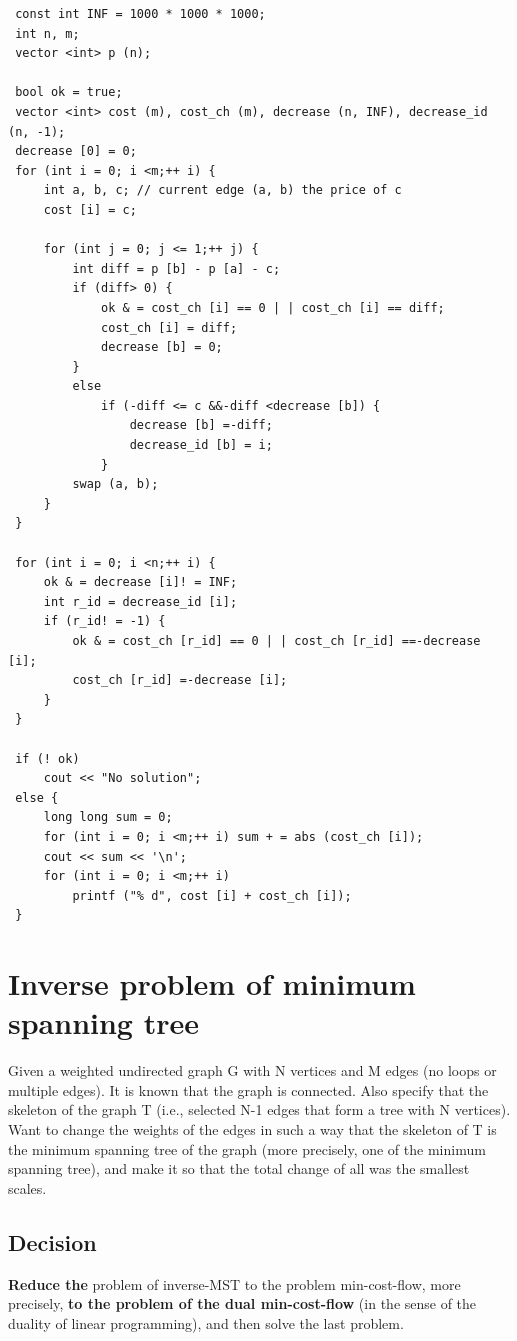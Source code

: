 \begin{verbatim}
 const int INF = 1000 * 1000 * 1000;
 int n, m;
 vector <int> p (n);

 bool ok = true;
 vector <int> cost (m), cost_ch (m), decrease (n, INF), decrease_id (n, -1);
 decrease [0] = 0;
 for (int i = 0; i <m;++ i) {
     int a, b, c; // current edge (a, b) the price of c
     cost [i] = c;

     for (int j = 0; j <= 1;++ j) {
         int diff = p [b] - p [a] - c;
         if (diff> 0) {
             ok & = cost_ch [i] == 0 | | cost_ch [i] == diff;
             cost_ch [i] = diff;
             decrease [b] = 0;
         }
         else
             if (-diff <= c &&-diff <decrease [b]) {
                 decrease [b] =-diff;
                 decrease_id [b] = i;
             }
         swap (a, b);
     }
 }

 for (int i = 0; i <n;++ i) {
     ok & = decrease [i]! = INF;
     int r_id = decrease_id [i];
     if (r_id! = -1) {
         ok & = cost_ch [r_id] == 0 | | cost_ch [r_id] ==-decrease [i];
         cost_ch [r_id] =-decrease [i];
     }
 }

 if (! ok)
     cout << "No solution";
 else {
     long long sum = 0;
     for (int i = 0; i <m;++ i) sum + = abs (cost_ch [i]);
     cout << sum << '\n';
     for (int i = 0; i <m;++ i)
         printf ("% d", cost [i] + cost_ch [i]);
 } 
\end{verbatim}
\section{ Inverse problem of minimum spanning tree }
Given a weighted undirected graph G with N vertices and M edges (no loops or multiple edges). It is known that the graph is connected. Also specify that the skeleton of the graph T (i.e., selected N-1 edges that form a tree with N vertices). Want to change the weights of the edges in such a way that the skeleton of T is the minimum spanning tree of the graph (more precisely, one of the minimum spanning tree), and make it so that the total change of all was the smallest scales.

\subsection{ Decision }
\textbf{Reduce the} problem of inverse-MST to the problem min-cost-flow, more precisely, \textbf{to the problem of the dual min-cost-flow} (in the sense of the duality of linear programming), and then solve the last problem.

